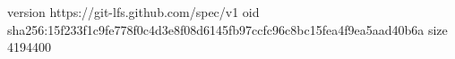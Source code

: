 version https://git-lfs.github.com/spec/v1
oid sha256:15f233f1c9fe778f0c4d3e8f08d6145fb97ccfc96c8bc15fea4f9ea5aad40b6a
size 4194400
